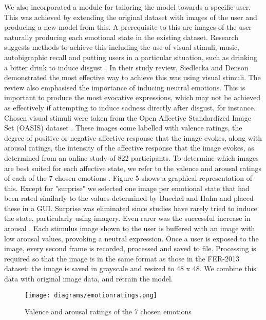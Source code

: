 \documentclass[12pt,a4paper]{article}
\begin{document}
We also incorporated a module for tailoring the model towards a specific user. This was achieved by extending the original dataset with images of the user and producing a new model from this. A prerequisite to this are images of the user naturally producing each emotional state in the existing dataset. Research suggests methods to achieve this including the use of visual stimuli, music, autobigraphic recall and putting users in a particular situation, such as drinking a bitter drink to induce disgust \cite{siedlecka2019experimental}. In their study review, Siedlecka and Denson demonstrated the most effective way to achieve this was using visual stimuli. The review also emphasised the importance of inducing neutral emotions. This is important to produce the most evocative expressions, which may not be achieved as effectively if attempting to induce sadness directly after disgust, for instance. Chosen visual stimuli were taken from the 
Open Affective Standardized Image Set (OASIS) dataset \cite{kurdi2017introducing}. These images come labelled with valence ratings, the degree of positive or negative affective response that the image evokes, along with arousal ratings, the intensity of the affective response that the image evokes, as determined from an online study of 822 participants. To determine which images are best suited for each affective state, we refer to the valence and arousal ratings of each of the 7 chosen emotions \cite{buechel2016emotion}. Figure 5 shows a graphical representation of this. Except for "surprise" we selected one image per emotional state that had been rated similarly to the values determined by Buechel and Hahn and placed these in a GUI. Surprise was eliminated since studies have rarely tried to induce the state, particularly using imagery. Even rarer was the successful increase in arousal \cite{siedlecka2019experimental}. Each stimulus image shown to the user is buffered with an image with low arousal values, provoking a neutral expression. Once a user is exposed to the image, every second frame is recorded, processed and saved to file. Processing is required so that the image is in the same format as those in the FER-2013 dataset: the image is saved in grayscale and resized to 48 x 48. We combine this data with original image data, and retrain the model.

\begin{figure}[h]
	\centerline{\texttt{[image: diagrams/emotionratings.png]}}
	\caption{Valence and arousal ratings of the 7 chosen emotions}
\end{figure}
\end{document}
